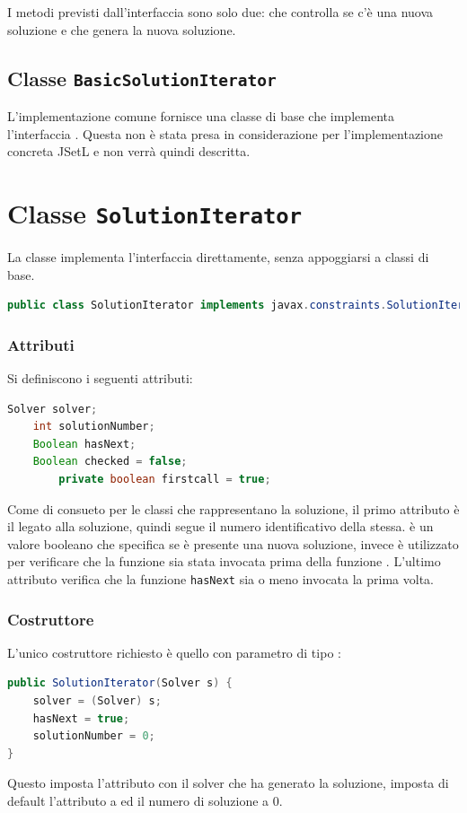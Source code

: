 I metodi previsti dall'interfaccia sono solo due:  che controlla
se c'è una nuova soluzione e  che genera la nuova soluzione.

\subsection{Classe \texttt{BasicSolutionIterator}}
L'implementazione comune fornisce una classe di base che implementa
l'interfaccia . Questa non è stata presa in 
considerazione per
l'implementazione concreta JSetL e non verrà quindi descritta.

\section{Classe \texttt{SolutionIterator}}\label{solIter}
La classe  implementa l'interfaccia
 direttamente, senza appoggiarsi a classi di base.
\begin{lstlisting}[language = Java,frame = single]
public class SolutionIterator implements javax.constraints.SolutionIterator {
\end{lstlisting}


\subsubsection{Attributi}
Si definiscono i seguenti attributi:
\begin{lstlisting}[language = Java,frame = single]
	Solver solver;
	int solutionNumber;
	Boolean hasNext;
	Boolean checked = false;
        private boolean firstcall = true;
\end{lstlisting}
Come di consueto per le classi che rappresentano la soluzione, il primo 
attributo è il  legato alla soluzione, quindi segue il numero
identificativo della stessa.  è un valore booleano che
specifica se è presente una nuova soluzione,  invece
è utilizzato per verificare che la funzione  sia stata
invocata prima della funzione . L'ultimo attributo verifica
che la funzione \texttt{hasNext} sia o meno invocata la prima volta.

\subsubsection{Costruttore}
L'unico costruttore richiesto è quello con parametro di tipo :
\begin{lstlisting}[language = Java,
                   caption = {il costruttore di \files{SolutionIterator}.}]
public SolutionIterator(Solver s) {
	solver = (Solver) s;
	hasNext = true;
	solutionNumber = 0;
}
\end{lstlisting}
Questo imposta l'attributo  con il solver che ha generato la
soluzione, imposta di default l'attributo  a 
ed il numero di soluzione a $0$.

